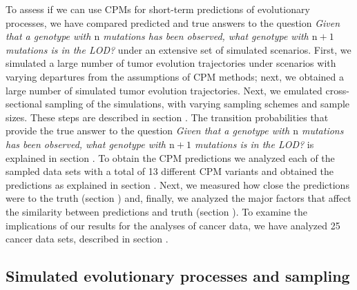 \documentclass[a4paper,10pt]{article}
\begin{document}
To assess if we can use CPMs for short-term predictions of evolutionary
processes, we have compared predicted and true answers to the question
\textit{Given that a genotype with $\mathrm{n}$ mutations has been
  observed, what genotype with $\mathrm{n}+1$ mutations is in the LOD?}
under an extensive set of simulated scenarios. First, we simulated a large
number of tumor evolution trajectories under scenarios with varying
departures from the assumptions of CPM methods; next, we obtained a large
number of simulated tumor evolution trajectories.  Next, we emulated
cross-sectional sampling of the simulations, with varying sampling schemes
and sample sizes. These steps are described in section
.  The transition probabilities that
provide the true answer to the question \textit{Given that a genotype with
  $\mathrm{n}$ mutations has been observed, what genotype with
  $\mathrm{n}+1$ mutations is in the LOD?}  is explained in section
. To obtain the CPM predictions we analyzed each
of the sampled data sets with a total of 13 different CPM variants and
obtained the predictions as explained in section
. Next, we measured how close the predictions were to
the truth (section ) and, finally, we analyzed the major
factors that affect the similarity between predictions and truth (section
).  To examine the implications of our
results for the analyses of cancer data, we have analyzed 25 cancer data
sets, described in section .


\subsection{Simulated evolutionary processes and sampling} \label{methods:simulsandsampling}
\end{document}
